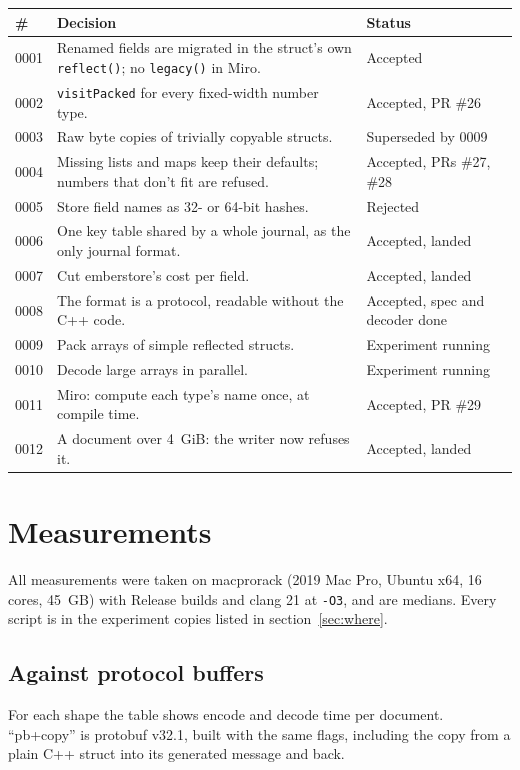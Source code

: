 \documentclass[11pt,a4paper]{article}
\newcommand{\code}[1]{\texttt{#1}}
\begin{document}
\begin{tabularx}{\textwidth}{@{}l X l@{}}
\toprule
\# & Decision & Status \\
\midrule
0001 & Renamed fields are migrated in the struct's own \code{reflect()}; no \code{legacy()} in Miro. & Accepted \\
0002 & \code{visitPacked} for every fixed-width number type. & Accepted, PR \#26 \\
0003 & Raw byte copies of trivially copyable structs. & Superseded by 0009 \\
0004 & Missing lists and maps keep their defaults; numbers that don't fit are refused. & Accepted, PRs \#27, \#28 \\
0005 & Store field names as 32- or 64-bit hashes. & Rejected \\
0006 & One key table shared by a whole journal, as the only journal format. & Accepted, landed \\
0007 & Cut emberstore's cost per field. & Accepted, landed \\
0008 & The format is a protocol, readable without the C++ code. & Accepted, spec and decoder done \\
0009 & Pack arrays of simple reflected structs. & Experiment running \\
0010 & Decode large arrays in parallel. & Experiment running \\
0011 & Miro: compute each type's name once, at compile time. & Accepted, PR \#29 \\
0012 & A document over 4~GiB: the writer now refuses it. & Accepted, landed \\
\bottomrule
\end{tabularx}

\section{Measurements}

All measurements were taken on macprorack (2019 Mac Pro, Ubuntu x64, 16 cores, 45~GB) with Release builds and clang 21 at \code{-O3}, and are medians. Every script is in the experiment copies listed in section~\ref{sec:where}.

\subsection{Against protocol buffers}

For each shape the table shows encode and decode time per document. ``pb+copy'' is protobuf v32.1, built with the same flags, including the copy from a plain C++ struct into its generated message and back.
\end{document}
